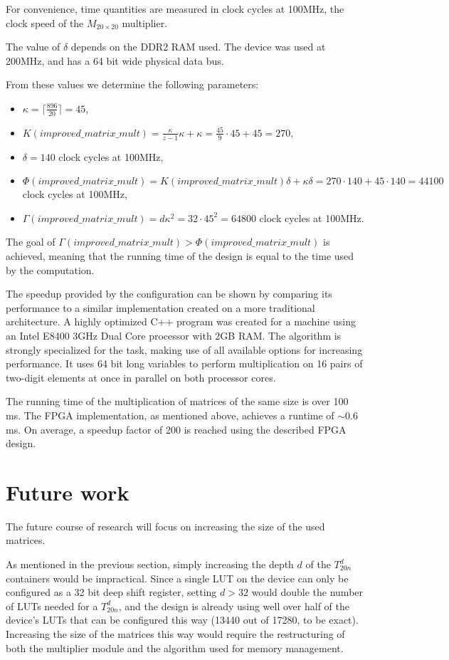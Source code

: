 \documentclass[11pt,twoside]{article}
\begin{document}
For convenience, time quantities are measured in clock cycles at 100MHz, the clock speed of the $M_{20 \times 20}$ multiplier.

The value of $\delta$ depends on the DDR2 RAM used. The device was used at 200MHz, and has a 64 bit wide physical data bus.

From these values we determine the following parameters:
\begin{itemize}
\item $\kappa=\lceil \frac{896}{20} \rceil=45$,
\item $K(improved\_matrix\_mult)=\frac{\kappa}{z-1}\kappa+\kappa=\frac{45}{9}\cdot 45 + 45=270$,
\item $\delta=140$ clock cycles at 100MHz,
\item $\Phi(improved\_matrix\_mult)=K(improved\_matrix\_mult)\delta+\kappa\delta=270\cdot 140 + 45 \cdot 140=44100$ clock cycles at 100MHz,
\item $\Gamma(improved\_matrix\_mult)=d\kappa^2=32 \cdot 45^2=64800$ clock cycles at 100MHz.
\end{itemize}
The goal of $\Gamma(improved\_matrix\_mult)>\Phi(improved\_matrix\_mult)$ is a\-chieved, meaning that the running time of the design is equal to the time used by the computation.

The speedup provided by the configuration can be shown by comparing its performance to a similar implementation created on a more traditional architecture. A highly optimized C++ program was created for a machine using an Intel E8400 3GHz Dual Core processor with 2GB RAM. The algorithm is strongly specialized for the task, making use of all available options for increasing performance. It uses 64 bit long variables to perform multiplication on 16 pairs of two-digit elements at once in parallel on both processor cores.

The running time of the multiplication of matrices of the same size is over 100 ms. The FPGA implementation, as mentioned above, achieves a runtime of $\sim$0.6 ms. On average, a speedup factor of 200 is reached using the described FPGA design.

\section{Future work}

The future course of research will focus on increasing the size of the used matrices.

As mentioned in the previous section, simply increasing the depth $d$ of the $T_{20n}^{d}$ containers would be impractical. Since a single LUT on the device can only be configured as a 32 bit deep shift register, setting $d>32$ would double the number of LUTs needed for a $T_{20n}^{d}$, and the design is already using well over half of the device's LUTs that can be configured this way (13440 out of 17280, to be exact). Increasing the size of the matrices this way would require the restructuring of both the multiplier module and the algorithm used for memory management.
\end{document}
